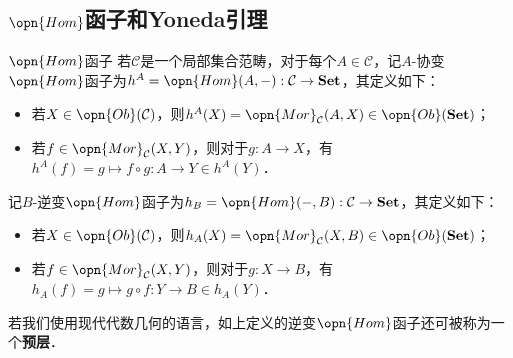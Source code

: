 \subsection{$\opn{Hom}$函子和Yoneda引理}
\begin{definition}{$\opn{Hom}$函子}
若$\mathcal{C}$是一个局部集合范畴，对于每个$A\in\mathcal{C}$，记$A$-协变$\opn{Hom}$函子为$h^A=\opn{Hom}(A,-):\mathcal{C}\to\mathbf{Set}$，其定义如下：
\begin{itemize}
\item 若$X\in\opn{Ob}(\mathcal{C})$，则$h^A(X)=\opn{Mor}_\mathcal{C}(A,X)\in\opn{Ob}(\mathbf{Set})$；
\item 若$f\in\opn{Mor}_\mathcal{C}(X,Y)$，则对于$g:A\to X$，有$h^A(f)=g\mapsto f\circ g:A\to Y\in h^A(Y)$．
\end{itemize}

记$B$-逆变$\opn{Hom}$函子为$h_B=\opn{Hom}(-,B):\mathcal{C}\to\mathbf{Set}$，其定义如下：
\begin{itemize}
\item 若$X\in\opn{Ob}(\mathcal{C})$，则$h_A(X)=\opn{Mor}_\mathcal{C}(X,B)\in\opn{Ob}(\mathbf{Set})$；
\item 若$f\in\opn{Mor}_\mathcal{C}(X,Y)$，则对于$g:X\to B$，有$h_A(f)=g\mapsto g\circ f:Y\to B\in h_A(Y)$．
\end{itemize}
\end{definition}
若我们使用现代代数几何的语言，如上定义的逆变$\opn{Hom}$函子还可被称为一个\textbf{预层}．
